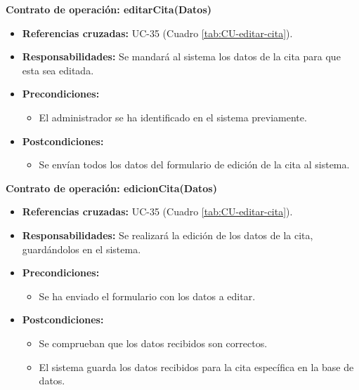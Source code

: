 \textbf{Contrato de operación: editarCita(Datos)}
\begin{itemize}
\item \textbf{Referencias cruzadas:} UC-35 (Cuadro \ref{tab:CU-editar-cita}).
\item \textbf{Responsabilidades:} Se mandará al sistema los datos de la cita para que esta sea editada.
\item \textbf{Precondiciones:} 
 \begin{itemize}
\item El administrador se ha identificado en el sistema previamente.
\end {itemize}
\item \textbf{Postcondiciones:} 
 \begin{itemize}
\item Se envían todos los datos del formulario de edición de la cita al sistema.
\end {itemize}
\end {itemize}

\textbf{Contrato de operación: edicionCita(Datos)}
\begin{itemize}
\item \textbf{Referencias cruzadas:} UC-35 (Cuadro \ref{tab:CU-editar-cita}).
\item \textbf{Responsabilidades:} Se realizará la edición de los datos de la cita, guardándolos en el sistema.
\item \textbf{Precondiciones:} 
 \begin{itemize}
\item Se ha enviado el formulario con los datos a editar.
\end {itemize}
\item \textbf{Postcondiciones:} 
 \begin{itemize}
 \item Se comprueban que los datos recibidos son correctos.
\item El sistema guarda los datos recibidos para la cita específica en la base de datos.
\end {itemize}
\end {itemize}


